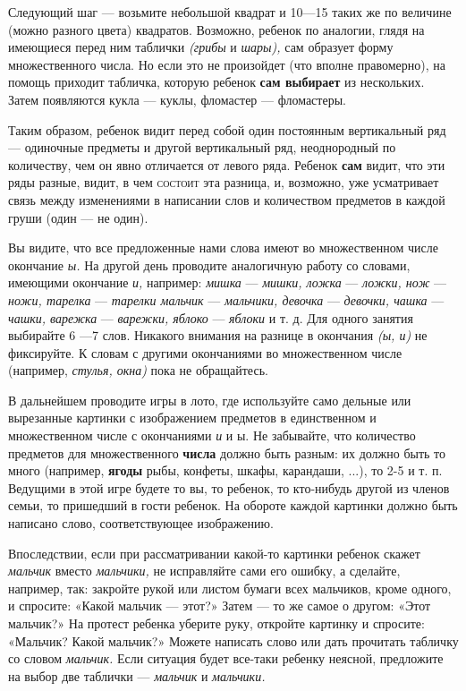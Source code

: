 \documentclass[a5paper]{book}
\renewcommand{\emph}[1]{\textit{#1}}
\begin{document}
Следующий шаг --- возьмите небольшой квадрат и 10---15 таких же по
величине (можно разного цвета) квадратов. Возможно, ребенок по аналогии,
глядя на имеющиеся перед ним таблички \emph{(грибы} и \emph{шары),} сам
образует форму множественного числа. Но если это не произойдет (что
вполне правомерно), на помощь приходит табличка, которую ребенок
\textbf{сам выбирает} из нескольких. Затем появляются кукла --- куклы,
фломастер --- фломастеры.

Таким образом, ребенок видит перед собой один постоянным вертикальный
ряд --- одиночные предметы и другой вертикальный ряд, неоднородный по
количеству, чем он явно отличается от левого ряда. Ребенок \textbf{сам}
видит, что эти ряды разные, видит, в чем \textsc{состоит} эта разница,
и, возможно, уже усматривает связь между изменениями в написании слов и
количеством предметов в каждой груши (один --- не один).

Вы видите, что все предложенные нами слова имеют во множественном числе
окончание \emph{ы.} На другой день проводите аналогичную работу со
словами, имеющими окончание \emph{и,} например: \emph{мишка} ---
\emph{мишки, ложка} --- \emph{ложки, нож} --- \emph{ножи, тарелка} ---
\emph{тарелки мальчик} --- \emph{мальчики, девочка} --- \emph{девочки,
чашка} --- \emph{чашки, варежка} --- \emph{варежки, яблоко} ---
\emph{яблоки} и т. д. Для одного занятия выбирайте 6 ---7 слов. Никакого
внимания на разнице в окончания \emph{(ы, и)} не фиксируйте. К словам с
другими окончаниями во множественном числе (например, \emph{стулья,
окна)} пока не обращайтесь.

В дальнейшем проводите игры в лото, где используйте само дельные или
вырезанные картинки с изображением предметов в единственном и
множественном числе с окончаниями \emph{и} и ы. Не забывайте, что
количество предметов для множественного \textbf{числа} должно быть
разным: их должно быть то много (например, \textbf{ягоды} рыбы, конфеты,
шкафы, карандаши, ...), то 2-5 и т. п. Ведущими в этой игре будете то
вы, то ребенок, то кто-нибудь другой из членов семьи, то пришедший в
гости ребенок. На обороте каждой картинки должно быть написано слово,
соответствующее изображению.

Впоследствии, если при рассматривании какой-то картинки ребенок скажет
\emph{мальчик} вместо \emph{мальчики,} не исправляйте сами его ошибку, а
сделайте, например, так: закройте рукой или листом бумаги всех
мальчиков, кроме одного, и спросите: «Какой мальчик --- этот?» Затем ---
то же самое о другом: «Этот мальчик?» На протест ребенка уберите руку,
откройте картинку и спросите: «Мальчик? Какой мальчик?» Можете написать
слово или дать прочитать табличку со словом \emph{мальчик.} Если
ситуация будет все-таки ребенку неясной, предложите на выбор две
таблички --- \emph{мальчик} и \emph{мальчики.}
\end{document}
